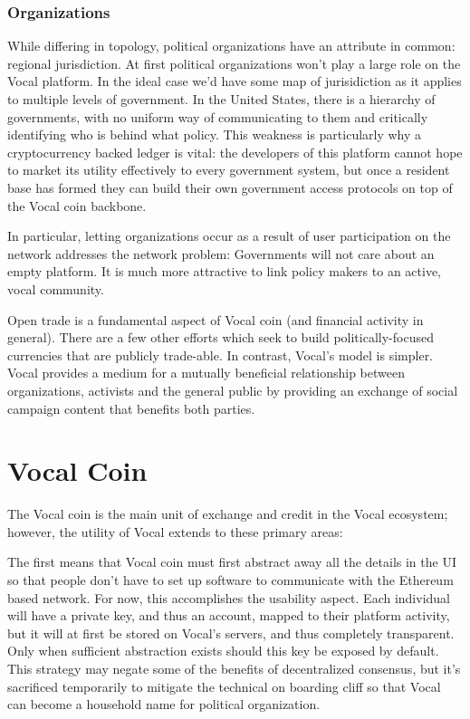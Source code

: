 \documentclass[conference]{IEEEtran}
\begin{document}
    \subsubsection{Organizations}
    While differing in topology, political organizations have an attribute in common: regional jurisdiction. At first political organizations won't play a large role on the Vocal platform. In the ideal case we'd have some map of jurisidiction as it applies to multiple levels of government. In the United States, there is a hierarchy of governments, with no uniform way of communicating to them and critically identifying who is behind what policy. This weakness is particularly why a cryptocurrency backed ledger is vital: the developers of this platform cannot hope to market its utility effectively to every government system, but once a resident base has formed they can build their own government access protocols on top of the Vocal coin backbone.

    In particular, letting organizations occur as a result of user participation on the network addresses the network problem: Governments will not care about an empty platform. It is much more attractive to link policy makers to an active, vocal community. 

    Open trade is a fundamental aspect of Vocal coin (and financial activity in general). There are a few other efforts which seek to build politically-focused currencies that are publicly trade-able. In contrast, Vocal's model is simpler. Vocal provides a medium for a mutually beneficial relationship between organizations, activists and the general public by providing an exchange of social campaign content that benefits both parties.

    \section{Vocal Coin}

    The Vocal coin is the main unit of exchange and credit in the Vocal ecosystem; however, the utility of Vocal extends to these primary areas:

    The first means that Vocal coin must first abstract away all the details in the UI so that people don't have to set up software to communicate with the Ethereum based network. For now, this accomplishes the usability aspect. Each individual will have a private key, and thus an account, mapped to their platform activity, but it will at first be stored on Vocal's servers, and thus completely transparent. Only when sufficient abstraction exists should this key be exposed by default. This strategy may negate some of the benefits of decentralized consensus, but it's sacrificed temporarily to mitigate the technical on boarding cliff so that Vocal can become a household name for political organization.
\end{document}

